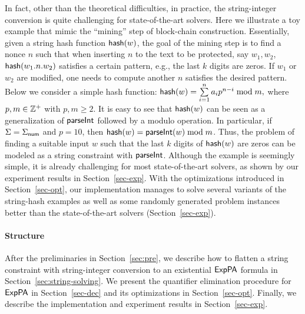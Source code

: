 In fact, other than the theoretical difficulties, in practice, the string-integer conversion is quite challenging for state-of-the-art solvers. 
Here we illustrate a toy example that mimic the ``mining'' step of block-chain construction. 
Essentially, given a string hash function ${\sf hash}(w)$, the goal of the mining step is to find a nonce $n$ such that when inserting $n$ to the text to be protected, say $w_1,w_2$, ${\sf hash}(w_1.n.w_2)$ satisfies a certain pattern, e.g., the last $k$ digits are zeros. 
If $w_1$ or $w_2$ are modified, one needs to compute another $n$ satisfies the desired pattern.
Below we consider a simple hash function:
${\sf hash}(w) = \sum \limits_{i = 1}^n a_i p^{n-i} \bmod m,$
where $p, m \in \mathbb{Z}^+$ with $p, m \ge 2$. 
It is easy to see that ${\sf hash}(w)$ can be seen as a generalization of $\textsf{parseInt}$ followed by a modulo operation. 
In particular, if $\Sigma = \Sigma_{\sf num}$ and $p = 10$, then ${\sf hash}(w) = \textsf{parseInt}(w) \bmod m$. Thus, the problem of finding a suitable input $w$ such that the last $k$ digits of ${\sf hash}(w)$ are zeros can be modeled as a string constraint with $\textsf{parseInt}$. Although the example is seemingly simple, it is already challenging for most state-of-the-art solvers, as shown by our experiment results in Section~\ref{sec-exp}. 
With the optimizations introduced in Section~\ref{sec-opt}, 
our implementation manages to solve several variants of the string-hash examples as well as some randomly generated problem instances better than the state-of-the-art solvers (Section~\ref{sec-exp}). 
 
\paragraph*{Structure}
After the preliminaries in Section~\ref{sec:pre}, we describe how to flatten a string constraint with string-integer conversion to an existential ${\sf ExpPA}$ formula in Section~\ref{sec:string-solving}. We present the quantifier elimination procedure for ${\sf ExpPA}$ in Section~\ref{sec-dec} and its optimizations in Section~\ref{sec-opt}. Finally, we describe the implementation and experiment results in Section~\ref{sec-exp}.


